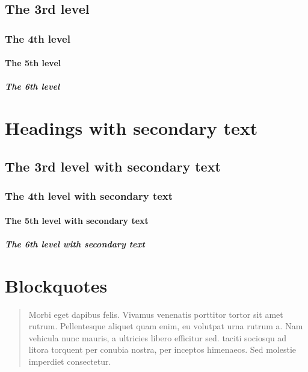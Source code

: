 \documentclass[letterpaper,10pt,english]{sphinxmanual}
\begin{document}
\subsection{The 3rd level}
\label{\detokenize{markdown:the-3rd-level}}

\subsubsection{The 4th level}
\label{\detokenize{markdown:the-4th-level}}

\paragraph{The 5th level}
\label{\detokenize{markdown:the-5th-level}}

\subparagraph{The 6th level}
\label{\detokenize{markdown:the-6th-level}}

\section{Headings with secondary text}
\label{\detokenize{markdown:headings-small-with-secondary-text-small}}

\subsection{The 3rd level with secondary text}
\label{\detokenize{markdown:the-3rd-level-small-with-secondary-text-small}}

\subsubsection{The 4th level with secondary text}
\label{\detokenize{markdown:the-4th-level-small-with-secondary-text-small}}

\paragraph{The 5th level with secondary text}
\label{\detokenize{markdown:the-5th-level-small-with-secondary-text-small}}

\subparagraph{The 6th level with secondary text}
\label{\detokenize{markdown:the-6th-level-small-with-secondary-text-small}}

\section{Blockquotes}
\label{\detokenize{markdown:blockquotes}}\begin{quote}

Morbi eget dapibus felis. Vivamus venenatis porttitor tortor sit amet rutrum.
Pellentesque aliquet quam enim, eu volutpat urna rutrum a. Nam vehicula nunc
mauris, a ultricies libero efficitur sed.  taciti sociosqu ad
litora torquent per conubia nostra, per inceptos himenaeos. Sed molestie
imperdiet consectetur.
\end{quote}
\end{document}

